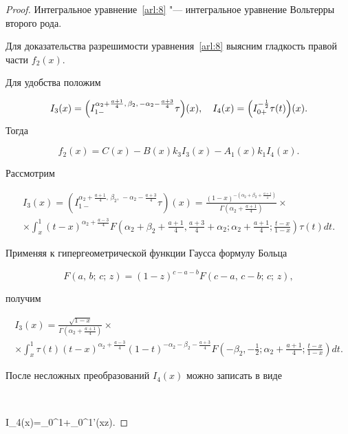 \begin{proof}
Интегральное уравнение~\eqref{arl:8} "--- интегральное уравнение Вольтерры второго рода.

Для доказательства разрешимости уравнения~\eqref{arl:8} выясним гладкость правой части $f_2(x)$.



Для удобства положим

$$I_3(x)=\Bigl(I^{\alpha_2+\frac{a+1}{4},\,\beta_2,\,-\alpha_2-\frac{a+3}{4}}_{1-}\tau\Bigr)(x),\quad  I_4(x)=\Bigl(I^{-\frac 12}_{0+}\tau(t)\Bigr)(x).$$ Тогда

$$f_2(x)=C(x)-B(x)k_3I_3(x)-A_1(x)k_1I_4(x).$$

Рассмотрим 

\begin{multline*}

I_3(x)=\left(I^{\alpha_2+\frac{a+1}{4},\,\beta_2,\,-\alpha_2-\frac{a+3}{4}}_{1-}\tau\right)(x)=\frac{(1-x)^{-\left(\alpha_2+\beta_2+\frac{a+1}{4}\right)}}{\Gamma\left(\alpha_2+\frac{a+1}{4}\right)}\times

\\ \times\int_{x}^{1}(t\!-\!x)^{\alpha_2\!+\!\frac{a\!-\!3}{4}}F\left(\alpha_2\!+\!\beta_2\!+\!\frac{a\!+\!1}{4},\frac{a\!+\!3}{4}\!+\!\alpha_2;\alpha_2\!+\!\frac{a\!+\!1}{4};\frac{t\!-\!x}{1\!-\!x}\right)\tau(t)dt.


\end{multline*}

Применяя к гипергеометрической функции Гаусса формулу Больца~\mbox{\cite{arl:bib:8}}

$$F(a,\,b;\,c;\,z)=(1-z)^{c-a-b}F(c-a,\,c-b;\,c;\,z),$$

получим

\begin{multline*}

I_3(x)=\frac{\sqrt{1-x}}{\Gamma\left(\alpha_2+\frac{a+1}{4}\right)}\times

\\ \times\int_{x}^{1}\tau(t)(t\!-\!x)^{\alpha_2+\frac{a-3}{4}}(1\!-\!t)^{-\alpha_2-\beta_2-\frac{a+3}{4}}F\left(-\beta_2,-\frac 12;\alpha_2\!+\!\frac{a\!+\!1}{4};\frac{t\!-\!x}{1\!-\!x}\right)dt.


\end{multline*}

После несложных преобразований $I_4(x)$ можно записать в виде

$$

I_4(x)=\int_{0}^{1}+\int_{0}^{1}\tau'(xz).


\end{proof}
